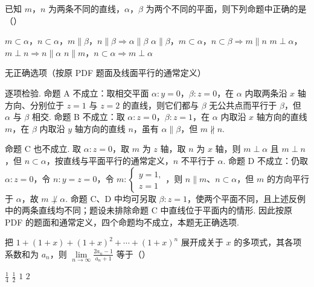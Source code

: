 \begin{problem}
已知 \(m\)，\(n\) 为两条不同的直线，\(\alpha\)，\(\beta\) 为两个不同的平面，则下列命题中正确的是（\quad）

\choices
    {\(m \subset \alpha\)，\(n \subset \alpha\)，\(m \parallel \beta\)，\(n \parallel \beta \Rightarrow \alpha \parallel \beta\)}
    {\(\alpha \parallel \beta\)，\(m \subset \alpha\)，\(n \subset \beta \Rightarrow m \parallel n\)}
    {\(m \perp \alpha\)，\(m \perp n \Rightarrow n \parallel \alpha\)}
    {\(n \parallel m\)，\(n \subset \alpha \Rightarrow m \perp \alpha\)}
\end{problem}

\begin{answer}
无正确选项（按原 PDF 题面及线面平行的通常定义）
\end{answer}

\begin{solution}
逐项检验. 命题 A 不成立：取相交平面 \(\alpha\colon y=0\)，\(\beta\colon z=0\)，在 \(\alpha\) 内取两条沿 \(x\) 轴方向、分别位于 \(z=1\) 与 \(z=2\) 的直线，则它们都与 \(\beta\) 无公共点而平行于 \(\beta\)，但 \(\alpha\) 与 \(\beta\) 相交. 命题 B 不成立：取 \(\alpha\colon z=0\)，\(\beta\colon z=1\)，在 \(\alpha\) 内取沿 \(x\) 轴方向的直线 \(m\)，在 \(\beta\) 内取沿 \(y\) 轴方向的直线 \(n\)，虽有 \(\alpha\parallel\beta\)，但 \(m\not\parallel n\).

命题 C 也不成立. 取 \(\alpha\colon z=0\)，取 \(m\) 为 \(z\) 轴，取 \(n\) 为 \(x\) 轴，则 \(m\perp\alpha\) 且 \(m\perp n\)，但 \(n\subset\alpha\)，按直线与平面平行的通常定义，\(n\) 不平行于 \(\alpha\). 命题 D 不成立：仍取 \(\alpha\colon z=0\)，令 \(n\colon y=z=0\)，令 \(m\colon\begin{cases}
y=1,\\
z=1
\end{cases}\)，则 \(n\parallel m\)、\(n\subset\alpha\)，但 \(m\) 的方向平行于 \(\alpha\)，故 \(m\not\perp\alpha\). 命题 C、D 中均可另取 \(\beta\colon z=1\)，使两个平面不同，且上述反例中的两条直线均不同；题设未排除命题 C 中直线位于平面内的情形. 因此按原 PDF 的题面和通常定义，四个命题均不成立，本题无正确选项.
\end{solution}

\begin{problem}
把 \(1 + (1 + x) + (1 + x)^2 + \cdots + (1 + x)^n\) 展开成关于 \(x\) 的多项式，其各项系数和为 \(a_n\)，则 \(\lim\limits_{n \to \infty} \frac{2a_n - 1}{a_n + 1}\) 等于（\quad）

\choices
    {\( \frac{1}{4} \)}
    {\( \frac{1}{2} \)}
    {\(1\)}
    {\(2\)}
\end{problem}

